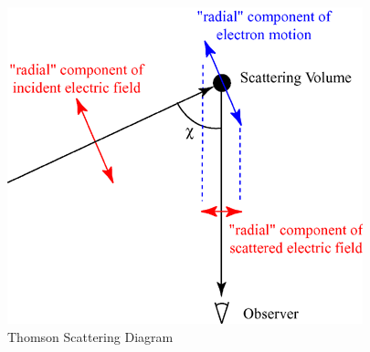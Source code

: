 			\begin{figure}[h]
				\caption{Thomson Scattering Diagram}
				\centering
				\includegraphics[width=\textwidth / 2]{images/thomson_scattering.png}
			\end{figure}
			
			
